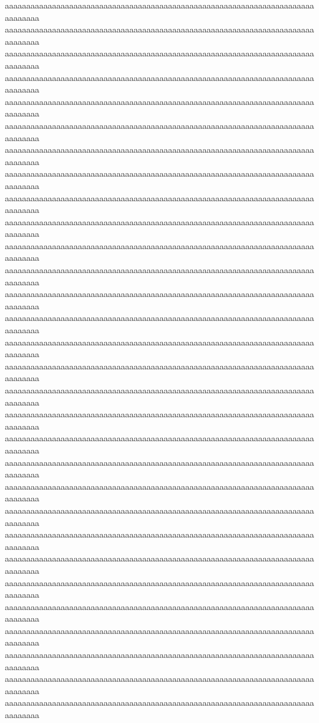 aaaaaaaaaaaaaaaaaaaaaaaaaaaaaaaaaaaaaaaaaaaaaaaaaaaaaaaaaaaaaaaaaaaaaaaaaaaaaaaa
aaaaaaaaaaaaaaaaaaaaaaaaaaaaaaaaaaaaaaaaaaaaaaaaaaaaaaaaaaaaaaaaaaaaaaaaaaaaaaaa
aaaaaaaaaaaaaaaaaaaaaaaaaaaaaaaaaaaaaaaaaaaaaaaaaaaaaaaaaaaaaaaaaaaaaaaaaaaaaaaa
aaaaaaaaaaaaaaaaaaaaaaaaaaaaaaaaaaaaaaaaaaaaaaaaaaaaaaaaaaaaaaaaaaaaaaaaaaaaaaaa
aaaaaaaaaaaaaaaaaaaaaaaaaaaaaaaaaaaaaaaaaaaaaaaaaaaaaaaaaaaaaaaaaaaaaaaaaaaaaaaa
aaaaaaaaaaaaaaaaaaaaaaaaaaaaaaaaaaaaaaaaaaaaaaaaaaaaaaaaaaaaaaaaaaaaaaaaaaaaaaaa
aaaaaaaaaaaaaaaaaaaaaaaaaaaaaaaaaaaaaaaaaaaaaaaaaaaaaaaaaaaaaaaaaaaaaaaaaaaaaaaa
aaaaaaaaaaaaaaaaaaaaaaaaaaaaaaaaaaaaaaaaaaaaaaaaaaaaaaaaaaaaaaaaaaaaaaaaaaaaaaaa
aaaaaaaaaaaaaaaaaaaaaaaaaaaaaaaaaaaaaaaaaaaaaaaaaaaaaaaaaaaaaaaaaaaaaaaaaaaaaaaa
aaaaaaaaaaaaaaaaaaaaaaaaaaaaaaaaaaaaaaaaaaaaaaaaaaaaaaaaaaaaaaaaaaaaaaaaaaaaaaaa
aaaaaaaaaaaaaaaaaaaaaaaaaaaaaaaaaaaaaaaaaaaaaaaaaaaaaaaaaaaaaaaaaaaaaaaaaaaaaaaa
aaaaaaaaaaaaaaaaaaaaaaaaaaaaaaaaaaaaaaaaaaaaaaaaaaaaaaaaaaaaaaaaaaaaaaaaaaaaaaaa
aaaaaaaaaaaaaaaaaaaaaaaaaaaaaaaaaaaaaaaaaaaaaaaaaaaaaaaaaaaaaaaaaaaaaaaaaaaaaaaa
aaaaaaaaaaaaaaaaaaaaaaaaaaaaaaaaaaaaaaaaaaaaaaaaaaaaaaaaaaaaaaaaaaaaaaaaaaaaaaaa
aaaaaaaaaaaaaaaaaaaaaaaaaaaaaaaaaaaaaaaaaaaaaaaaaaaaaaaaaaaaaaaaaaaaaaaaaaaaaaaa
aaaaaaaaaaaaaaaaaaaaaaaaaaaaaaaaaaaaaaaaaaaaaaaaaaaaaaaaaaaaaaaaaaaaaaaaaaaaaaaa
aaaaaaaaaaaaaaaaaaaaaaaaaaaaaaaaaaaaaaaaaaaaaaaaaaaaaaaaaaaaaaaaaaaaaaaaaaaaaaaa
aaaaaaaaaaaaaaaaaaaaaaaaaaaaaaaaaaaaaaaaaaaaaaaaaaaaaaaaaaaaaaaaaaaaaaaaaaaaaaaa
aaaaaaaaaaaaaaaaaaaaaaaaaaaaaaaaaaaaaaaaaaaaaaaaaaaaaaaaaaaaaaaaaaaaaaaaaaaaaaaa
aaaaaaaaaaaaaaaaaaaaaaaaaaaaaaaaaaaaaaaaaaaaaaaaaaaaaaaaaaaaaaaaaaaaaaaaaaaaaaaa
aaaaaaaaaaaaaaaaaaaaaaaaaaaaaaaaaaaaaaaaaaaaaaaaaaaaaaaaaaaaaaaaaaaaaaaaaaaaaaaa
aaaaaaaaaaaaaaaaaaaaaaaaaaaaaaaaaaaaaaaaaaaaaaaaaaaaaaaaaaaaaaaaaaaaaaaaaaaaaaaa
aaaaaaaaaaaaaaaaaaaaaaaaaaaaaaaaaaaaaaaaaaaaaaaaaaaaaaaaaaaaaaaaaaaaaaaaaaaaaaaa
aaaaaaaaaaaaaaaaaaaaaaaaaaaaaaaaaaaaaaaaaaaaaaaaaaaaaaaaaaaaaaaaaaaaaaaaaaaaaaaa
aaaaaaaaaaaaaaaaaaaaaaaaaaaaaaaaaaaaaaaaaaaaaaaaaaaaaaaaaaaaaaaaaaaaaaaaaaaaaaaa
aaaaaaaaaaaaaaaaaaaaaaaaaaaaaaaaaaaaaaaaaaaaaaaaaaaaaaaaaaaaaaaaaaaaaaaaaaaaaaaa
aaaaaaaaaaaaaaaaaaaaaaaaaaaaaaaaaaaaaaaaaaaaaaaaaaaaaaaaaaaaaaaaaaaaaaaaaaaaaaaa
aaaaaaaaaaaaaaaaaaaaaaaaaaaaaaaaaaaaaaaaaaaaaaaaaaaaaaaaaaaaaaaaaaaaaaaaaaaaaaaa
aaaaaaaaaaaaaaaaaaaaaaaaaaaaaaaaaaaaaaaaaaaaaaaaaaaaaaaaaaaaaaaaaaaaaaaaaaaaaaaa
aaaaaaaaaaaaaaaaaaaaaaaaaaaaaaaaaaaaaaaaaaaaaaaaaaaaaaaaaaaaaaaaaaaaaaaaaaaaaaaa
